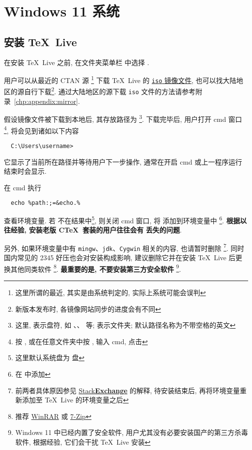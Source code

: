 
\chapter{Windows 11 系统}

\section{安装 \TeX~Live}\label{sec:windows:install}

在安装 \TeX~Live 之前,
在文件夹菜单栏  中选择 .

用户可以从最近的 CTAN 源%
\footnote{这里所谓的最近, 其实是由系统判定的, 实际上系统可能会误判}%
下载 \TeX~Live 的
\href{https://mirrors.ctan.org/systems/texlive/Images/texlive2025.iso}{\texttt{iso} 镜像文件},
也可以找大陆地区的源自行下载\footnote{新版本发布时, 各镜像网站同步的进度会有不同}.
通过大陆地区的源下载 \texttt{iso} 文件的方法请参考附录~\ref{chp:appendix:mirror}.

假设镜像文件被下载到本地后,
其存放路径为 %
\footnote{这里,  表示盘符,
如 、、 等;
 表示文件夹;
默认路径名称为不带空格的英文}.
下载完毕后, 用户打开 \textsf{cmd} 窗口%
\footnote{按 \keys{\faWindows},
或在任意文件夹中按 ,
输入 \textsf{cmd},
点击 \keys{\enter}},
将会见到诸如以下内容
\begin{lstlisting}
  C:\Users\username>
\end{lstlisting}
它显示了当前所在路径并等待用户下一步操作,
通常在开启 \textsf{cmd} 或上一程序运行结束时会显示.

在 \textsf{cmd} 执行
\begin{lstlisting}
  echo %path:;=&echo.%
\end{lstlisting}
查看环境变量.
若 
不在结果中\footnote{这里默认系统盘为  盘},
则关闭 \textsf{cmd} 窗口,
将 
添加到环境变量中%
\footnote{在  中添加}.
\textbf{根据以往经验, 安装老版 C\TeX\ 套装的用户往往会有}
 \textbf{丢失的问题}.

另外, 如果环境变量中有 \texttt{mingw}、\texttt{jdk}、\texttt{Cygwin} 相关的内容,
也请暂时删除%
\footnote{前两者具体原因参见
\href{https://tex.stackexchange.com/questions/445086/error-installing-latest-version-of-tex-live-on-windows-10}{\textsf{Stack\textbf{Exchange}}}
的解释, 待安装结束后, 再将环境变量重新添加至 \TeX~Live 的环境变量之后}.
同时国内常见的 2345 好压也会对安装构成影响,
建议删除它并在安装 \TeX~Live 后更换其他同类软件%
\footnote{推荐 \href{http://www.winrar.com.cn/}{WinRAR}
或 \href{https://www.7-zip.org/}{7-Zip}}.
\textbf{最重要的是, 不要安装第三方安全软件}%
\footnote{Windows 11 中已经内置了安全软件,
用户尤其没有必要安装国产的第三方杀毒软件,
根据经验,
它们会干扰 \TeX~Live 安装}.

